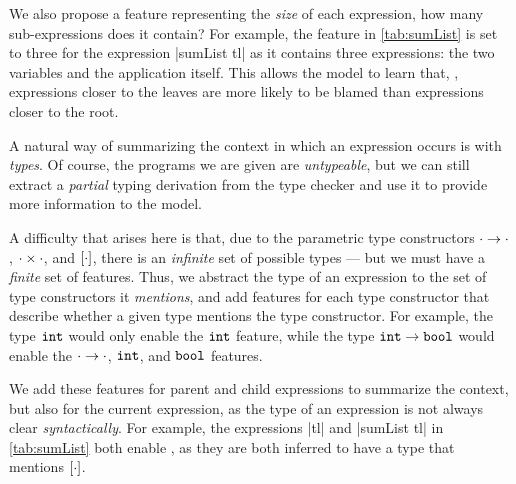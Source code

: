 
We also propose a feature representing the \emph{size} of each expression,
\ie how many sub-expressions does it contain?
%
For example, the \ExprSize feature in \autoref{tab:sumList} is set to three
for the expression |sumList tl| as it contains three expressions:
the two variables and the application itself.
%
This allows the model to learn that, \eg, expressions closer to the
leaves are more likely to be blamed than expressions closer to the root.

A natural way of summarizing the context in which an expression occurs
is with \emph{types}.
%
Of course, the programs we are given are \emph{untypeable}, but we can
still extract a \emph{partial} typing derivation from the type checker
and use it to provide more information to the model.

A difficulty that arises here is that, due to the parametric type
constructors $\cdot \rightarrow \cdot$, $\cdot \times \cdot$, and
$[\cdot]$, there is an \emph{infinite} set of possible types ---
but we must have a \emph{finite} set of features.
%
Thus, we abstract the type of an expression to the set of type
constructors it \emph{mentions}, and add features for each type
constructor that describe whether a given type mentions the type
constructor.
%
For example, the type $\mathtt{int}$ would only enable the $\mathtt{int}$ feature,
while the type $\mathtt{int} \rightarrow \mathtt{bool}$ would enable the
$\cdot \rightarrow \cdot$, $\mathtt{int}$, and $\mathtt{bool}$ features.

We add these features for parent and child expressions to summarize the
context, but also for the current expression, as the type of an
expression is not always clear \emph{syntactically}.
%
For example, the expressions |tl| and |sumList tl|
in \autoref{tab:sumList} both enable \HasTypeList, as they
are both inferred to have a type that mentions $[\cdot]$.

